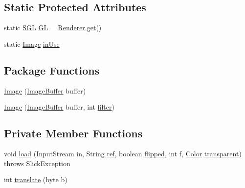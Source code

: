 \subsection*{Static Protected Attributes}
\begin{DoxyCompactItemize}
\item 
static \mbox{\hyperlink{interfaceorg_1_1newdawn_1_1slick_1_1opengl_1_1renderer_1_1_s_g_l}{S\+GL}} \mbox{\hyperlink{classorg_1_1newdawn_1_1slick_1_1_image_aafbab31355bec79e747f477e970dcda4}{GL}} = \mbox{\hyperlink{classorg_1_1newdawn_1_1slick_1_1opengl_1_1renderer_1_1_renderer_abe742c3a7dfca67c6c01821d27087308}{Renderer.\+get}}()
\item 
static \mbox{\hyperlink{classorg_1_1newdawn_1_1slick_1_1_image}{Image}} \mbox{\hyperlink{classorg_1_1newdawn_1_1slick_1_1_image_a2a474928fc97b6caec518f7eb6e553e6}{in\+Use}}
\end{DoxyCompactItemize}
\subsection*{Package Functions}
\begin{DoxyCompactItemize}
\item 
\mbox{\hyperlink{classorg_1_1newdawn_1_1slick_1_1_image_a7d6dcf1b5554a9f570258ac76f10d774}{Image}} (\mbox{\hyperlink{classorg_1_1newdawn_1_1slick_1_1_image_buffer}{Image\+Buffer}} buffer)
\item 
\mbox{\hyperlink{classorg_1_1newdawn_1_1slick_1_1_image_a9c15ce123caa1346f628ad9b7ede7c4d}{Image}} (\mbox{\hyperlink{classorg_1_1newdawn_1_1slick_1_1_image_buffer}{Image\+Buffer}} buffer, int \mbox{\hyperlink{classorg_1_1newdawn_1_1slick_1_1_image_a1c6f09687817420f3762f32bb1c3ed76}{filter}})
\end{DoxyCompactItemize}
\subsection*{Private Member Functions}
\begin{DoxyCompactItemize}
\item 
void \mbox{\hyperlink{classorg_1_1newdawn_1_1slick_1_1_image_a1c239bfea809dc2f4e6bafbdab613622}{load}} (Input\+Stream in, String \mbox{\hyperlink{classorg_1_1newdawn_1_1slick_1_1_image_a32694687591a80299d8b8ad1ea070cee}{ref}}, boolean \mbox{\hyperlink{classorg_1_1newdawn_1_1slick_1_1_image_a45ebd330142d5ca956f6634158971ab0}{flipped}}, int f, \mbox{\hyperlink{classorg_1_1newdawn_1_1slick_1_1_color}{Color}} \mbox{\hyperlink{classorg_1_1newdawn_1_1slick_1_1_image_a3da3000703612fcb8595be3408c91757}{transparent}})  throws Slick\+Exception 
\item 
int \mbox{\hyperlink{classorg_1_1newdawn_1_1slick_1_1_image_a18427cc301ec2a3e6f7a2906d797e9ba}{translate}} (byte b)
\end{DoxyCompactItemize}
